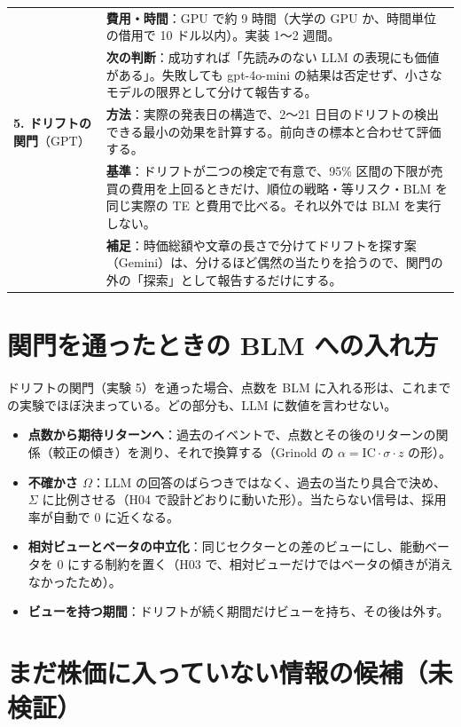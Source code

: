 \documentclass[xelatex,ja=standard,jafont=haranoaji,a4paper,10pt]{bxjsreport}
\begin{document}
\begin{longtable}{p{2.6cm}p{11.6cm}}
& \textbf{費用・時間}：GPU で約 9 時間（大学の GPU か、時間単位の借用で 10 ドル以内）。実装 1〜2 週間。\\
& \textbf{次の判断}：成功すれば「先読みのない LLM の表現にも価値がある」。失敗しても gpt-4o-mini の結果は否定せず、小さなモデルの限界として分けて報告する。\\
\midrule
\textbf{5. ドリフトの関門}（GPT） & \textbf{方法}：実際の発表日の構造で、2〜21 日目のドリフトの検出できる最小の効果を計算する。前向きの標本と合わせて評価する。\\
& \textbf{基準}：ドリフトが二つの検定で有意で、95\% 区間の下限が売買の費用を上回るときだけ、順位の戦略・等リスク・BLM を同じ実際の TE と費用で比べる。それ以外では BLM を実行しない。\\
& \textbf{補足}：時価総額や文章の長さで分けてドリフトを探す案（Gemini）は、分けるほど偶然の当たりを拾うので、関門の外の「探索」として報告するだけにする。\\
\end{longtable}

\section{関門を通ったときの BLM への入れ方}

ドリフトの関門（実験 5）を通った場合、点数を BLM に入れる形は、これまでの実験でほぼ決まっている。どの部分も、LLM に数値を言わせない。

\begin{itemize}
\item \textbf{点数から期待リターンへ}：過去のイベントで、点数とその後のリターンの関係（較正の傾き）を測り、それで換算する（Grinold の $\alpha=\mathrm{IC}\cdot\sigma\cdot z$ の形）。
\item \textbf{不確かさ $\Omega$}：LLM の回答のばらつきではなく、過去の当たり具合で決め、$\Sigma$ に比例させる（H04 で設計どおりに動いた形）。当たらない信号は、採用率が自動で 0 に近くなる。
\item \textbf{相対ビューとベータの中立化}：同じセクターとの差のビューにし、能動ベータを 0 にする制約を置く（H03 で、相対ビューだけではベータの傾きが消えなかったため）。
\item \textbf{ビューを持つ期間}：ドリフトが続く期間だけビューを持ち、その後は外す。
\end{itemize}

\section{まだ株価に入っていない情報の候補（未検証）}\label{sec:candidates}
\end{document}
